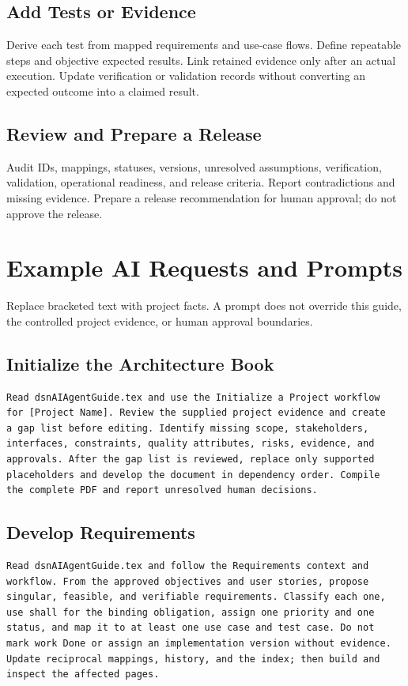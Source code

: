 \subsection{Add Tests or Evidence}
Derive each test from mapped requirements and use-case flows. Define repeatable
steps and objective expected results. Link retained evidence only after an
actual execution. Update verification or validation records without converting
an expected outcome into a claimed result.

\subsection{Review and Prepare a Release}
Audit IDs, mappings, statuses, versions, unresolved assumptions, verification,
validation, operational readiness, and release criteria. Report contradictions
and missing evidence. Prepare a release recommendation for human approval; do
not approve the release.

\section{Example AI Requests and Prompts}
\label{Section:AIExamplePrompts}
Replace bracketed text with project facts. A prompt does not override this
guide, the controlled project evidence, or human approval boundaries.

\subsection{Initialize the Architecture Book}
\begin{verbatim}
Read dsnAIAgentGuide.tex and use the Initialize a Project workflow
for [Project Name]. Review the supplied project evidence and create
a gap list before editing. Identify missing scope, stakeholders,
interfaces, constraints, quality attributes, risks, evidence, and
approvals. After the gap list is reviewed, replace only supported
placeholders and develop the document in dependency order. Compile
the complete PDF and report unresolved human decisions.
\end{verbatim}

\subsection{Develop Requirements}
\begin{verbatim}
Read dsnAIAgentGuide.tex and follow the Requirements context and
workflow. From the approved objectives and user stories, propose
singular, feasible, and verifiable requirements. Classify each one,
use shall for the binding obligation, assign one priority and one
status, and map it to at least one use case and test case. Do not
mark work Done or assign an implementation version without evidence.
Update reciprocal mappings, history, and the index; then build and
inspect the affected pages.
\end{verbatim}

